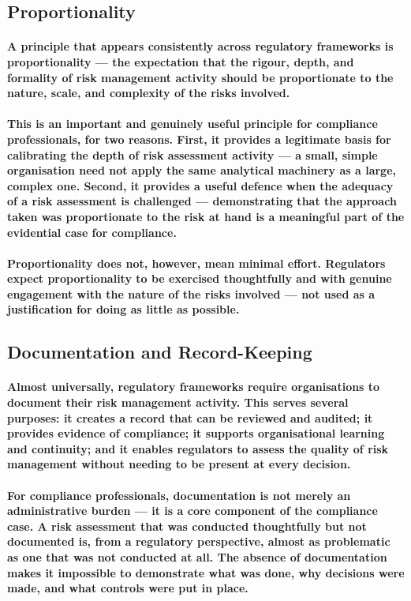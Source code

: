 \subsection{Proportionality}
\paragraph{A principle that appears consistently across regulatory frameworks is proportionality — the expectation that the rigour, depth, and formality of risk management activity should be proportionate to the nature, scale, and complexity of the risks involved.}
\paragraph{This is an important and genuinely useful principle for compliance professionals, for two reasons. First, it provides a legitimate basis for calibrating the depth of risk assessment activity — a small, simple organisation need not apply the same analytical machinery as a large, complex one. Second, it provides a useful defence when the adequacy of a risk assessment is challenged — demonstrating that the approach taken was proportionate to the risk at hand is a meaningful part of the evidential case for compliance.}
\paragraph{Proportionality does not, however, mean minimal effort. Regulators expect proportionality to be exercised thoughtfully and with genuine engagement with the nature of the risks involved — not used as a justification for doing as little as possible.}

\subsection{Documentation and Record-Keeping}
\paragraph{Almost universally, regulatory frameworks require organisations to \textbf{document their risk management activity}. This serves several purposes: it creates a record that can be reviewed and audited; it provides evidence of compliance; it supports organisational learning and continuity; and it enables regulators to assess the quality of risk management without needing to be present at every decision.}
\paragraph{For compliance professionals, documentation is not merely an administrative burden — it is a core component of the compliance case. A risk assessment that was conducted thoughtfully but not documented is, from a regulatory perspective, almost as problematic as one that was not conducted at all. The absence of documentation makes it impossible to demonstrate what was done, why decisions were made, and what controls were put in place.}
